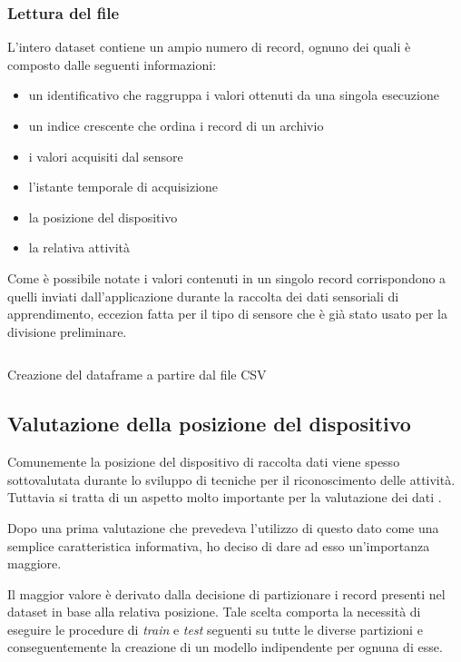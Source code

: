 \subsubsection{Lettura del file}
L'intero dataset contiene un ampio numero di record, ognuno dei quali è composto dalle seguenti informazioni:
\begin{itemize}
    \item un identificativo che raggruppa i valori ottenuti da una singola esecuzione
    \item un indice crescente che ordina i record di un archivio
    \item i valori acquisiti dal sensore
    \item l'istante temporale di acquisizione
    \item la posizione del dispositivo
    \item la relativa attività
\end{itemize}
Come è possibile notate i valori contenuti in un singolo record corrispondono a quelli inviati dall'applicazione durante 
la raccolta dei dati sensoriali di apprendimento,
eccezion fatta per il tipo di sensore che è già stato usato per la divisione preliminare.

\begin{listing}[H] 
    \inputminted[frame=single,framesep=10pt]{python}{snippets/classifier/read_csv.py}
    \caption{Creazione del dataframe a partire dal file CSV}
\end{listing}


\subsection{Valutazione della posizione del dispositivo}
Comunemente la posizione del dispositivo di raccolta dati viene spesso sottovalutata durante lo sviluppo di tecniche 
per il riconoscimento delle attività. Tuttavia si tratta di un aspetto molto importante per la valutazione dei dati \cite{umafall}.

Dopo una prima valutazione che prevedeva l'utilizzo di questo dato come una semplice caratteristica informativa, ho deciso 
di dare ad esso un'importanza maggiore. 

Il maggior valore è derivato dalla decisione di partizionare i record presenti nel dataset in base alla relativa posizione. 
Tale scelta comporta la necessità di eseguire le procedure di \textit{train} e \textit{test} seguenti su tutte le diverse partizioni 
e conseguentemente la creazione di un modello indipendente per ognuna di esse.

